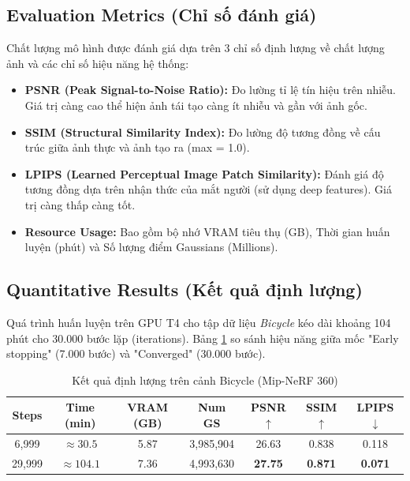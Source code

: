 \subsection{Evaluation Metrics (Chỉ số đánh giá)}
Chất lượng mô hình được đánh giá dựa trên 3 chỉ số định lượng về chất lượng ảnh và các chỉ số hiệu năng hệ thống:

\begin{itemize}
    \item \textbf{PSNR (Peak Signal-to-Noise Ratio):} Đo lường tỉ lệ tín hiệu trên nhiễu. Giá trị càng cao thể hiện ảnh tái tạo càng ít nhiễu và gần với ảnh gốc.
    \item \textbf{SSIM (Structural Similarity Index):} Đo lường độ tương đồng về cấu trúc giữa ảnh thực và ảnh tạo ra (max = 1.0).
    \item \textbf{LPIPS (Learned Perceptual Image Patch Similarity):} Đánh giá độ tương đồng dựa trên nhận thức của mắt người (sử dụng deep features). Giá trị càng thấp càng tốt.
    \item \textbf{Resource Usage:} Bao gồm bộ nhớ VRAM tiêu thụ (GB), Thời gian huấn luyện (phút) và Số lượng điểm Gaussians (Millions).
\end{itemize}

\subsection{Quantitative Results (Kết quả định lượng)}
Quá trình huấn luyện trên GPU T4 cho tập dữ liệu \textit{Bicycle} kéo dài khoảng 104 phút cho 30.000 bước lặp (iterations). Bảng \ref{tab:results} so sánh hiệu năng giữa mốc "Early stopping" (7.000 bước) và "Converged" (30.000 bước).

\begin{table}[h]
\centering
\caption{Kết quả định lượng trên cảnh Bicycle (Mip-NeRF 360)}
\label{tab:results}
\vspace{0.2cm}
\begin{tabular}{@{}ccccccc@{}}
\toprule
\textbf{Steps} & \textbf{Time (min)} & \textbf{VRAM (GB)} & \textbf{Num GS} & \textbf{PSNR} $\uparrow$ & \textbf{SSIM} $\uparrow$ & \textbf{LPIPS} $\downarrow$ \\ \midrule
6,999 & $\approx 30.5$ & 5.87 & 3,985,904 & 26.63 & 0.838 & 0.118 \\
29,999 & $\approx 104.1$ & 7.36 & 4,993,630 & \textbf{27.75} & \textbf{0.871} & \textbf{0.071} \\ \bottomrule
\end{tabular}
\end{table}

